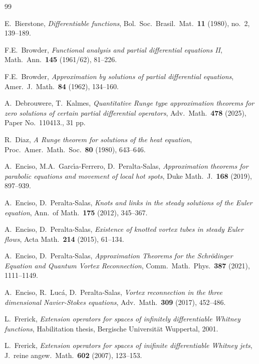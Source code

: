 \documentclass[10pt,leqno]{amsart}
\theoremstyle{definition}
\begin{document}
{\small
\begin{thebibliography}{99}



 E.~Bierstone, 
\emph{Differentiable functions}, 
Bol.~Soc.~Brasil.~Mat.~{\bf 11} (1980), no.~2, 139--189.

F.E.~Browder,
\emph{Functional analysis and partial differential equations II},
Math.~Ann.~{\bf 145} (1961/62), 81--226.

F.E.~Browder, 
\emph{Approximation by solutions of partial differential equations},
Amer.~J.~Math.~{\bf 84} (1962), 134--160.

 A.~Debrouwere, T.~Kalmes,
\emph{Quantitative Runge type approximation theorems for zero solutions of certain partial differential operators},
Adv.~Math.~{\bf 478} (2025), Paper No.~110413., 31 pp.

R.~Diaz,
\emph{A {R}unge theorem for solutions of the heat equation},
Proc.~Amer.~Math.~Soc.~{\bf 80} (1980), 643--646.

A.~Enciso, M.A.~Garc\'{\i}a-Ferrero, D.~Peralta-Salas, 
\emph{Approximation theorems for parabolic equations and movement of local hot spots},
Duke Math.~J.~{\bf 168} (2019), 897--939.

A.~Enciso, D.~Peralta-Salas, \emph{Knots and links in the steady solutions of the Euler equation}, Ann.~of Math.~{\bf 175} (2012), 345--367.

A.~Enciso, D.~Peralta-Salas,
\emph{Existence of knotted vortex tubes in steady Euler flows},
Acta Math.~{\bf 214} (2015), 61–134.

A.~Enciso, D.~Peralta-Salas,
\emph{Approximation {T}heorems for the {S}chr\"{o}dinger {E}quation and {Q}uantum {V}ortex {R}econnection},
Comm.~Math.~Phys.~{\bf 387} (2021), 1111--1149.

A.~Enciso, R.~Luc\'a, D.~Peralta-Salas, \emph{Vortex reconnection in the three dimensional Navier-Stokes equations}, Adv.~Math.~{\bf 309} (2017), 452--486.

 L.~Frerick,
\emph{Extension operators for spaces of infinitely differentiable Whitney functions}, 
Habilitation thesis, Bergische Universit\"at Wuppertal, 2001.

 L.~Frerick,
\emph{Extension operators for spaces of inifinite differentiable Whitney jets},
J.~reine angew.~Math.~{\bf 602} (2007), 123--153.


\end{thebibliography}}
\end{document}
